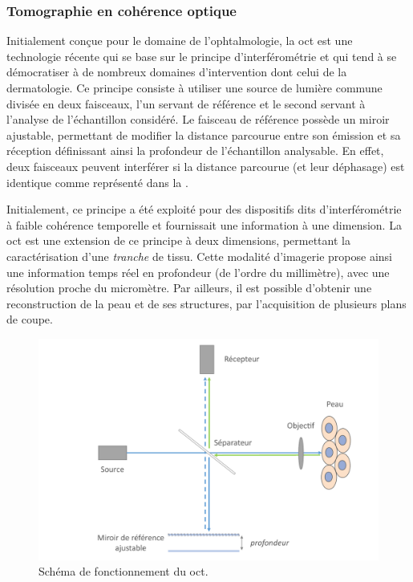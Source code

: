 \subsubsection{Tomographie en cohérence optique}
Initialement conçue pour le domaine de l’ophtalmologie, la \gls{oct} est une technologie récente qui se base sur le principe d’interférométrie et qui tend à se démocratiser à de nombreux domaines d’intervention dont celui de la dermatologie. Ce principe consiste à utiliser une source de lumière commune divisée en deux faisceaux, l’un servant de référence et le second servant à l’analyse de l’échantillon considéré. Le faisceau de référence possède un miroir ajustable, permettant de modifier la distance parcourue entre son émission et sa réception définissant ainsi la profondeur de l’échantillon analysable. En effet, deux faisceaux peuvent interférer si la distance parcourue (et leur déphasage) est identique comme représenté dans la .\par

Initialement, ce principe a été exploité pour des dispositifs dits d’interférométrie à faible cohérence temporelle et fournissait une information à une dimension. La \gls{oct} est une extension de ce principe à deux dimensions, permettant la caractérisation d’une \textit{tranche} de tissu. Cette modalité d’imagerie propose ainsi une information temps réel en profondeur (de l’ordre du millimètre), avec une résolution proche du micromètre. Par ailleurs, il est possible d'obtenir une reconstruction de la peau et de ses structures, par l'acquisition de plusieurs plans de coupe.\par

\begin{figure}[H]
    \centering
    \includegraphics[width=0.8\linewidth]{contents/chapter_2/resources/scheme_principle_oct.pdf}
    \caption{Schéma de fonctionnement du \gls{oct}.}
    \label{fig:scheme_principle_oct}
\end{figure}\par

